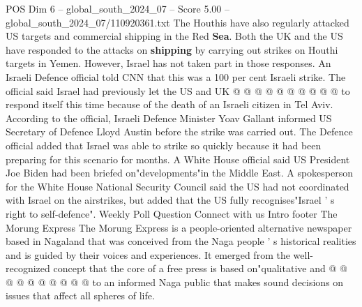\begin{textsample}{POS Dim 6 – global\_south\_2024\_07 – Score 5.00 – global\_south\_2024\_07/110920361.txt}
The Houthis have also regularly attacked US targets and commercial shipping in the Red \textbf{Sea}.
Both the UK and the US have responded to the attacks on \textbf{shipping} by carrying out strikes on Houthi targets in Yemen.
However, Israel has not taken part in those responses.
An Israeli Defence official told CNN that this was a 100 per cent Israeli strike.
The official said Israel had previously let the US and UK @ @ @ @ @ @ @ @ @ @ to respond itself this time because of the death of an Israeli citizen in Tel Aviv.
According to the official, Israeli Defence Minister Yoav Gallant informed US Secretary of Defence Lloyd Austin before the strike was carried out.
The Defence official added that Israel was able to strike so quickly because it had been preparing for this scenario for months.
A White House official said US President Joe Biden had been briefed on"developments"in the Middle East.
A spokesperson for the White House National Security Council said the US had not coordinated with Israel on the airstrikes, but added that the US fully recognises"Israel ' s right to self-defence".
Weekly Poll Question Connect with us Intro footer The Morung Express The Morung Express is a people-oriented alternative newspaper based in Nagaland that was conceived from the Naga people ' s historical realities and is guided by their voices and experiences.
It emerged from the well-recognized concept that the core of a free press is based on"qualitative and @ @ @ @ @ @ @ @ @ @ to an informed Naga public that makes sound decisions on issues that affect all spheres of life.

\end{textsample}
